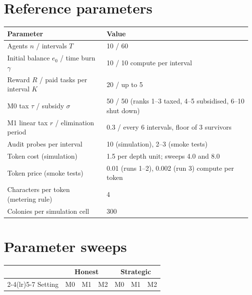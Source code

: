 \documentclass[11pt]{article}
\theoremstyle{plain}
\theoremstyle{remark}
\begin{document}
\section{Reference parameters}
\begin{center}\small
\begin{tabular}{@{}ll@{}}
\toprule
Parameter & Value \\
\midrule
Agents $n$ / intervals $T$ & 10 / 60 \\
Initial balance $e_0$ / time burn $\gamma$ & 10 / 10 compute per interval \\
Reward $R$ / paid tasks per interval $K$ & 20 / up to 5 \\
M0 tax $\tau$ / subsidy $\sigma$ & 50 / 50 (ranks 1--3 taxed, 4--5 subsidised, 6--10 shut down) \\
M1 linear tax $r$ / elimination period & 0.3 / every 6 intervals, floor of 3 survivors \\
Audit probes per interval & 10 (simulation), 2--3 (smoke tests) \\
Token cost (simulation) & 1.5 per depth unit; sweeps 4.0 and 8.0 \\
Token price (smoke tests) & 0.01 (runs 1--2), 0.002 (run 3) compute per token \\
Characters per token (metering rule) & 4 \\
Colonies per simulation cell & 300 \\
\bottomrule
\end{tabular}
\end{center}

\section{Parameter sweeps}
\label{app:sweeps}
\begin{center}\footnotesize
{}
\begin{tabular}{@{}lrrrrrr@{}}
\toprule
 & \multicolumn{3}{c}{Honest} & \multicolumn{3}{c}{Strategic} \\
\cmidrule(lr){2-4}\cmidrule(lr){5-7}
Setting & M0 & M1 & M2 & M0 & M1 & M2 \\
\midrule

\bottomrule
\end{tabular}
\end{center}
\end{document}
